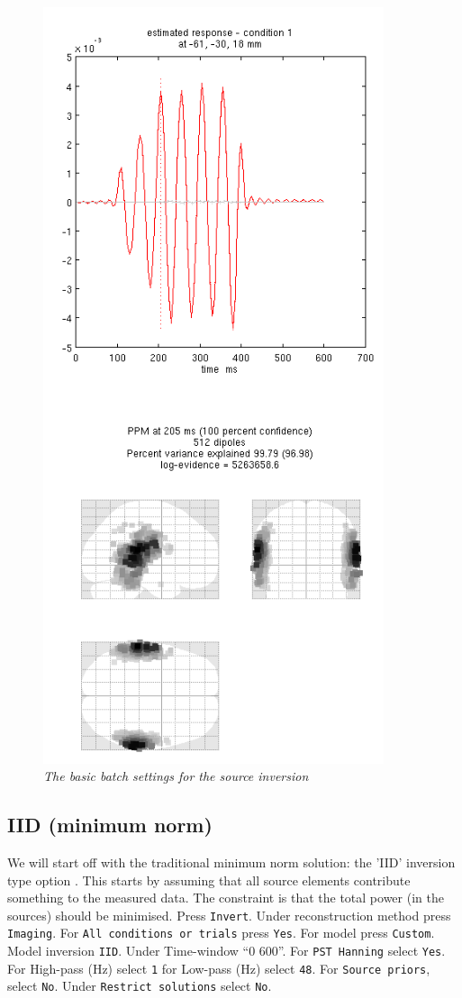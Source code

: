 \begin{figure}
\begin{center}
\includegraphics[width=100mm]{meg_sloc/slide3}
\caption{\em The basic batch settings for the source inversion} \label{meg_sloc:fig:3}
\end{center}
\end{figure}

\subsection{IID (minimum norm)}
We will start off with the traditional minimum norm solution: the 'IID' inversion type option . This starts by assuming that all source elements contribute something to the measured data. The constraint is that the total power (in the sources) should be minimised.
Press \texttt{Invert}. Under reconstruction method press \texttt{Imaging}. For \texttt{All conditions or trials} press \texttt{Yes}. For model press \texttt{Custom}. Model inversion \texttt{IID}. Under Time-window ``0 600''. For \texttt{PST Hanning} select \texttt{Yes}. For High-pass (Hz) select \texttt{1} for Low-pass (Hz) select \texttt{48}. For \texttt{Source priors}, select \texttt{No}. Under \texttt{Restrict solutions} select \texttt{No}. 

